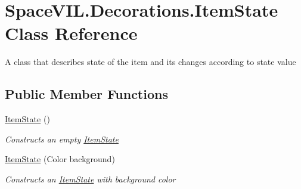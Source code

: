 \hypertarget{class_space_v_i_l_1_1_decorations_1_1_item_state}{}\section{Space\+V\+I\+L.\+Decorations.\+Item\+State Class Reference}
\label{class_space_v_i_l_1_1_decorations_1_1_item_state}


A class that describes state of the item and its changes according to state value  


\subsection*{Public Member Functions}
\begin{DoxyCompactItemize}
\item 
\mbox{\hyperlink{class_space_v_i_l_1_1_decorations_1_1_item_state_ad99c8d13eed2d2a995bbccc7b4d38ab5}{Item\+State}} ()
\begin{DoxyCompactList}\small\item\em Constructs an empty \mbox{\hyperlink{class_space_v_i_l_1_1_decorations_1_1_item_state}{Item\+State}} \end{DoxyCompactList}\item 
\mbox{\hyperlink{class_space_v_i_l_1_1_decorations_1_1_item_state_a9fc55f09c2eca01e8e465502683d8a1c}{Item\+State}} (Color background)
\begin{DoxyCompactList}\small\item\em Constructs an \mbox{\hyperlink{class_space_v_i_l_1_1_decorations_1_1_item_state}{Item\+State}} with background color \end{DoxyCompactList}\end{DoxyCompactItemize}
